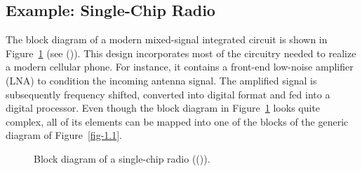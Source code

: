 \documentclass[
  11pt,
  letterpaper,
  abstract]{scrbook}
\begin{document}
\subsection{Example: Single-Chip Radio}\label{example-single-chip-radio}

The block diagram of a modern mixed-signal integrated circuit is shown
in Figure~\ref{fig-1.2} (see
()). This
design incorporates most of the circuitry needed to realize a modern
cellular phone. For instance, it contains a front-end low-noise
amplifier (LNA) to condition the incoming antenna signal. The amplified
signal is subsequently frequency shifted, converted into digital format
and fed into a digital processor. Even though the block diagram in
Figure~\ref{fig-1.2} looks quite complex, all of its elements can be
mapped into one of the blocks of the generic diagram of
Figure~\ref{fig-1.1}.

\begin{figure}


\caption{\label{fig-1.2}Block diagram of a single-chip radio
(()).}

\end{figure}%
\end{document}
